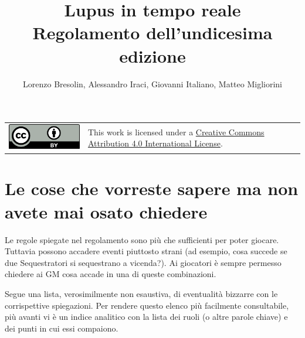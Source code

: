 \documentclass[a4paper,10pt]{article}
\title{Lupus in tempo reale\\ Regolamento dell'undicesima edizione}
\author{Lorenzo Bresolin, Alessandro Iraci, Giovanni Italiano, Matteo Migliorini}
\begin{document}
	
\maketitle

\begin{tabular}{lp{}}
	\begin{minipage}{0.22\textwidth}
		\vspace{3mm}
		\href{http://creativecommons.org/licenses/by/4.0/}{\includegraphics{ccby.pdf}}
	\end{minipage}
	&
	This work is licensed under a \href{http://creativecommons.org/licenses/by/4.0/}{Creative Commons Attribution 4.0 International License}.
\end{tabular}

\section*{Le cose che vorreste sapere ma non avete mai osato chiedere}
\label{faq}

Le regole spiegate nel regolamento sono più che sufficienti per poter giocare. Tuttavia possono accadere eventi piuttosto strani (ad esempio, cosa succede se due Sequestratori si sequestrano a vicenda?). Ai giocatori è sempre permesso chiedere ai GM cosa accade in una di queste combinazioni.

Segue una lista, verosimilmente non esaustiva, di eventualità bizzarre con le corrispettive spiegazioni.
Per rendere questo elenco più facilmente consultabile, più avanti vi è un indice analitico con la lista dei ruoli (o altre parole chiave) e dei punti in cui essi compaiono.
\end{document}
